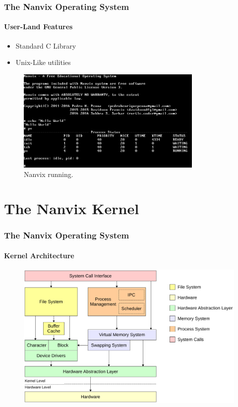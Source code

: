 \documentclass{beamer}
\begin{document}
		\begin{frame}
		\frametitle{The Nanvix Operating System}
		\framesubtitle{User-Land Features}
			\begin{itemize}
			\setlength\itemsep{0.5em}
				\item Standard C Library
				\item Unix-Like utilities

				\end{itemize}
				\begin{figure}
					\centering
					\includegraphics[width=0.8\textwidth]{nanvix}
					\caption{Nanvix running.}
				\end{figure}
		\end{frame}

\section{The Nanvix Kernel}

		\begin{frame}
		\frametitle{The Nanvix Operating System}
		\framesubtitle{Kernel Architecture}
			\begin{figure}
				\centering
				\includegraphics[width=\linewidth]{nanvix-architecture}
			\end{figure}
		\end{frame}
\end{document}
